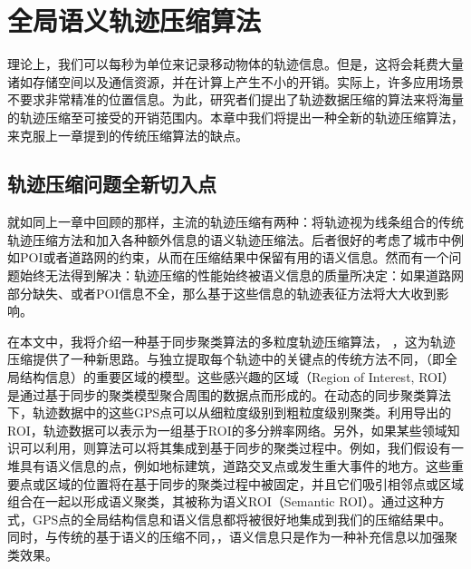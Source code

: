 
\chapter{全局语义轨迹压缩算法}
\label{chapter:main1}

理论上，我们可以每秒为单位来记录移动物体的轨迹信息。但是，这将会耗费大量诸如存储空间以及通信资源，并在计算上产生不小的开销。实际上，许多应用场景不要求非常精准的位置信息。为此，研究者们提出了轨迹数据压缩的算法来将海量的轨迹压缩至可接受的开销范围内。本章中我们将提出一种全新的轨迹压缩算法，来克服上一章提到的传统压缩算法的缺点。


\section{轨迹压缩问题全新切入点}
\label{sec:start}
就如同上一章中回顾的那样，主流的轨迹压缩有两种：将轨迹视为线条组合的传统轨迹压缩方法和加入各种额外信息的语义轨迹压缩法。后者很好的考虑了城市中例如POI或者道路网的约束，从而在压缩结果中保留有用的语义信息。然而有一个问题始终无法得到解决：轨迹压缩的性能始终被语义信息的质量所决定：如果道路网部分缺失、或者POI信息不全，那么基于这些信息的轨迹表征方法将大大收到影响。

在本文中，我将介绍一种基于同步聚类算法的多粒度轨迹压缩算法， \CascadeSync，这为轨迹压缩提供了一种新思路。与独立提取每个轨迹中的关键点的传统方法不同，（即全局结构信息）的重要区域的模型。这些感兴趣的区域（Region of Interest, ROI）是通过基于同步的聚类模型聚合周围的数据点而形成的。在动态的同步聚类算法下，轨迹数据中的这些GPS点可以从细粒度级别到粗粒度级别聚类。利用导出的ROI，轨迹数据可以表示为一组基于ROI的多分辨率网络。另外，如果某些领域知识可以利用，则算法可以将其集成到基于同步的聚类过程中。例如，我们假设有一堆具有语义信息的点，例如地标建筑，道路交叉点或发生重大事件的地方。这些重要点或区域的位置将在基于同步的聚类过程中被固定，并且它们吸引相邻点或区域组合在一起以形成语义聚类，其被称为语义ROI（Semantic ROI）。通过这种方式，GPS点的全局结构信息和语义信息都将被很好地集成到我们的压缩结果中。同时，与传统的基于语义的压缩不同，，语义信息只是作为一种补充信息以加强聚类效果。


